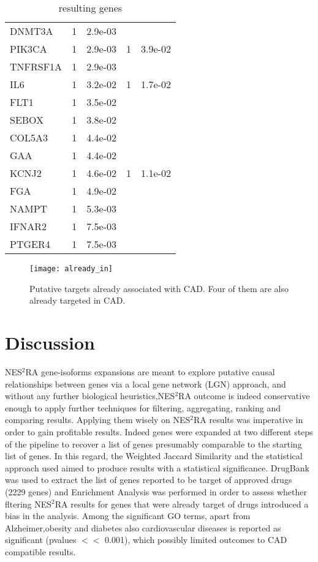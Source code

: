 \documentclass[fleqn,10pt]{SelfArx} %
\begin{document}
\begin{table}[!htb]
\begin{tabularx}{\linewidth}{XRRRR}
		DNMT3A & 1 & 2.9e-03 &  &  \\ 
		PIK3CA & 1 & 2.9e-03 & 1 & 3.9e-02 \\ 
		TNFRSF1A & 1 & 2.9e-03 &  &  \\ 
		IL6 & 1 & 3.2e-02 & 1 & 1.7e-02 \\ 
		FLT1 & 1 & 3.5e-02 &  &  \\ 
		SEBOX & 1 & 3.8e-02 &  &  \\ 
		COL5A3 & 1 & 4.4e-02 &  &  \\ 
		GAA & 1 & 4.4e-02 &  &  \\ 
		KCNJ2 & 1 & 4.6e-02 & 1 & 1.1e-02 \\ 
		FGA & 1 & 4.9e-02 &  &  \\ 
		NAMPT & 1 & 5.3e-03 &  &  \\ 
		IFNAR2 & 1 & 7.5e-03 &  &  \\ 
		PTGER4 & 1 & 7.5e-03 &  &  \\ 
	\end{tabularx}
	\smallskip
	\caption{resulting genes}
	\label{tab:sign}
\end{table}

\begin{figure}[ht]
	\texttt{[image: already\_in]}
	\smallskip
	\caption{Putative targets already associated with CAD. Four of them are also already targeted in CAD.}
	\label{fig:19CAD}
\end{figure}

\section*{Discussion}

NES$^2$RA gene-isoforms expansions are meant to explore putative causal relationships between genes via a local gene network (LGN) approach,   and without any further biological heuristics,NES$^2$RA outcome is indeed conservative enough to apply further techniques for filtering, aggregating, ranking and comparing results.
Applying them wisely on NES$^2$RA results was imperative in order to gain profitable results. Indeed genes were expanded at two different steps of the pipeline to recover a list of genes presumably comparable to the starting list of genes. In this regard, the Weighted Jaccard Similarity and the statistical approach used aimed to produce results with a statistical significance.  
DrugBank was used to extract the list of genes reported to be target of approved drugs (2229 genes) and Enrichment Analysis was performed in order to assess whether fltering NES$^2$RA results for genes that were already target of drugs introduced a bias in the analysis.
Among the significant GO terms, apart from Alzheimer,obesity and diabetes also cardiovascular diseases is reported as significant (pvalues $<<$ 0.001), which possibly limited outcomes to CAD compatible results.
\end{document}
